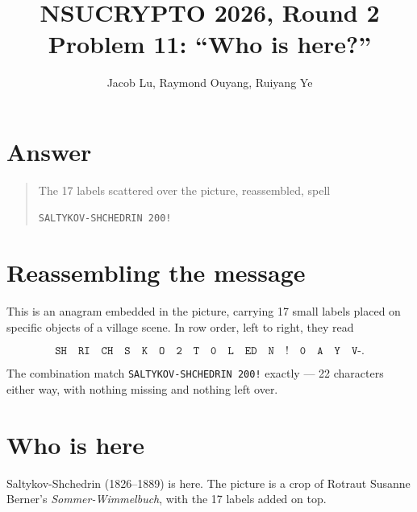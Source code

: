 \documentclass[11pt,a4paper]{article}
\title{NSUCRYPTO 2026, Round 2\\Problem 11: ``Who is here?''}
\date{}
\author{Jacob Lu, Raymond Ouyang, Ruiyang Ye}
\newcommand{\tx}[1]{\texttt{#1}}
\begin{document}
\maketitle

\section*{Answer}

\begin{quote}
The 17 labels scattered over the picture, reassembled, spell
\begin{center}
\Large \tx{SALTYKOV-SHCHEDRIN 200!}
\end{center}
\end{quote}

\section{Reassembling the message}

This is an anagram embedded in the picture, carrying 17 small labels placed on specific objects of a village
scene. In row order, left to right, they read

\[
\tx{SH}\quad \tx{RI}\quad \tx{CH}\quad \tx{S}\quad \tx{K}\quad \tx{O}\quad
\tx{2}\quad \tx{T}\quad \tx{0}\quad \tx{L}\quad \tx{ED}\quad \tx{N}\quad
\tx{!}\quad \tx{0}\quad \tx{A}\quad \tx{Y}\quad \tx{V-}.
\]

The combination match
\tx{SALTYKOV-SHCHEDRIN 200!} exactly --- 22 characters either way, with nothing
missing and nothing left over. 

\section{Who is here}

Saltykov-Shchedrin (1826--1889) is here. The picture is a crop of Rotraut
Susanne Berner's \emph{Sommer-Wimmelbuch}, with the 17 labels added on top.
\end{document}
